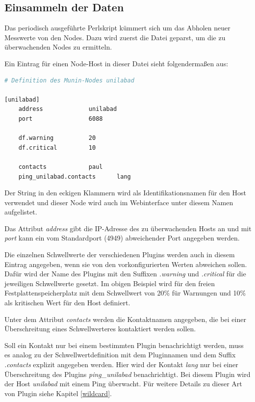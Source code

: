 \subsection{Einsammeln der Daten}
Das periodisch ausgeführte Perlskript  kümmert sich um das Abholen neuer Messwerte von den Nodes.
Dazu wird zuerst die Datei  geparst, um die zu überwachenden Nodes zu ermitteln.

Ein Eintrag für einen Node-Host in dieser Datei sieht folgendermaßen aus:


\begin{lstlisting}[captionpos=b, caption=Beispielhafte Definition eines Munin-Nodes, label=nodedef, breaklines = true, language=bash]
# Definition des Munin-Nodes unilabad

[unilabad]
	address 			unilabad
	port				6088
	
	df.warning			20
	df.critical			10
	
	contacts			paul
	ping_unilabad.contacts		lang
\end{lstlisting}

Der String in den eckigen Klammern wird als Identifikationsnamen für den Host verwendet und dieser Node wird auch im Webinterface unter diesem Namen aufgelistet.

Das Attribut \textit{address} gibt die IP-Adresse des zu überwachenden Hosts an und mit \textit{port} kann ein vom Standardport (4949) abweichender Port angegeben werden.

Die einzelnen Schwellwerte der verschiedenen Plugins werden auch in diesem Eintrag angegeben, wenn sie von den vorkonfigurierten Werten abweichen sollen.
Dafür wird der Name des Plugins mit den Suffixen \textit{.warning} und \textit{.critical} für die jeweiligen Schwellwerte gesetzt.
Im obigen Beispiel wird  für den freien Festplattenspeicherplatz mit dem Schwellwert von 20\% für Warnungen und 10\% als kritischen Wert für den Host definiert.

Unter dem Attribut \textit{contacts} werden die Kontaktnamen angegeben, die bei einer Überschreitung eines Schwellwerteres kontaktiert werden sollen.

Soll ein Kontakt nur bei einem bestimmten Plugin benachrichtigt werden, muss es analog zu der Schwellwertdefinition mit dem Pluginnamen und dem Suffix \textit{.contacts} explizit angegeben werden. Hier wird der Kontakt \textit{lang} nur bei einer Überschreitung des Plugins \textit{ping\_unilabad} benachrichtigt.
Bei diesem Plugin wird der Host \textit{unilabad} mit einem Ping überwacht.
Für weitere Details zu dieser Art von Plugin siehe Kapitel \ref{wildcard}.

